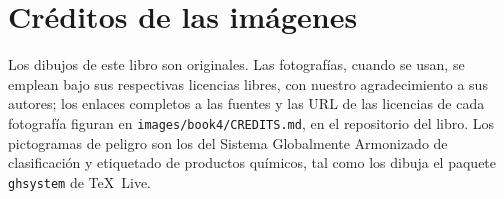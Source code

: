\chapter*{Créditos de las imágenes}

Los dibujos de este libro son originales. Las fotografías, cuando se
usan, se emplean bajo sus respectivas licencias libres, con nuestro
agradecimiento a sus autores; los enlaces completos a las fuentes y las
URL de las licencias de cada fotografía figuran en
\texttt{images/book4/CREDITS.md}, en el repositorio del libro.
Los pictogramas de peligro son los del Sistema Globalmente Armonizado de
clasificación y etiquetado de productos químicos, tal como los dibuja el
paquete \texttt{ghsystem} de \TeX\ Live.

